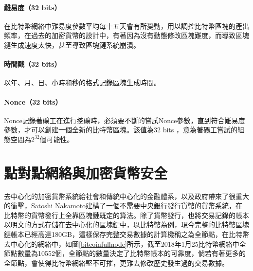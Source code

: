 			\paragraph{難易度（32 bits）}在比特幣網絡中難易度參數平均每十五天會有所變動，用以調控比特幣區塊的產出頻率，在過去的加密貨幣的設計中，有著因為沒有動態修改區塊難度，而導致區塊鏈生成速度太快，甚至導致區塊鏈系統崩潰。
			\paragraph{時間戳（32 bits）}以年、月、日、小時和秒的格式記錄區塊生成時間。
			\paragraph{Nonce（32 bits）}Nonce記錄著礦工在進行挖礦時，必須要不斷的嘗試Nonce參數，直到符合難易度參數，才可以創建一個全新的比特幣區塊。該值為32 bits ，意為著礦工嘗試的組態空間為$2^{32}$個可能性。


	\section{點對點網絡與加密貨幣安全}

	去中⼼化的加密貨幣系統給社會和傳統中⼼化的⾦融體系，以及政府帶來了很重⼤的衝擊，Satoshi Nakamoto建構了一個不需要中央銀行發行貨幣的貨幣系統，在比特幣的貨幣發行上全靠區塊鏈既定的算法。除了貨幣發行，也將交易記錄的帳本以明文的方式存儲在去中心化的區塊鏈中，以比特幣為例，現今完整的比特幣區塊鏈帳本已經高達180GB，這樣保存完整交易數據的計算機稱之為全節點，在比特幣去中心化的網絡中，如圖\ref{bitcoinfullnode}所示，截至2018年1月25比特幣網絡中全節點數量為10552個\supercite{bitcoinfullnode}，全節點的數量決定了比特幣帳本的可靠度，倘若有著更多的全節點，會使得比特幣網絡堅不可摧，更難去修改歷史發生過的交易數據。

